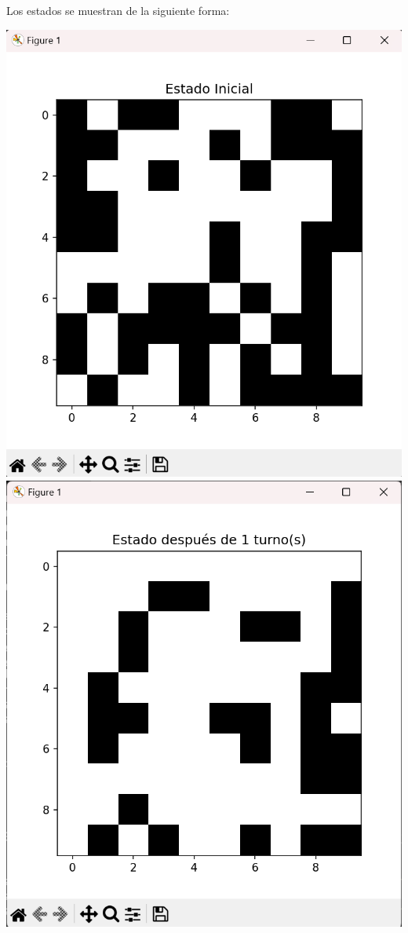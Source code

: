 \begin{itemize}
Los estados se muestran de la siguiente forma:
    \begin{center}
        \includegraphics[scale=0.4]{IMA/ejemplosJuegoVida/ejemplo 1.1.png}
        \includegraphics[scale=0.4]{IMA/ejemplosJuegoVida/ejemplo 1.2.png}

\end{center}
\end{itemize}
